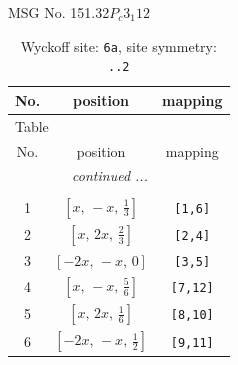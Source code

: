 \documentclass[fleqn,8pt]{jsarticle}
\begin{document}
\setcounter{MaxMatrixCols}{32}

\renewcommand{\tablename}{Table~}
\renewcommand{\figurename}{Figure~}
\begin{center}
\LARGE
MSG No. 151.32\quad$P_{c}3_{1}12$
\end{center}
\renewcommand{\arraystretch}{1.2}
\begin{longtable}{ccc}
\caption{Wyckoff site: {\tt 6a}, site symmetry: {\tt ..2}}
 \\
 \hline \hline
No. & position & mapping \\ \hline \endfirsthead

\multicolumn{2}{l}{\tablename\ \thetable{}} \\
 \hline \hline
No. & position & mapping \\ \hline \endhead

 \hline \hline
\multicolumn{2}{r}{\footnotesize\it continued ...} \\ \endfoot

 \hline \hline
\multicolumn{2}{r}{} \\ \endlastfoot

1 & $\left[ x,\, - x,\, \frac{1}{3} \right]$ & {\tt [1,6]} \\ \hline
2 & $\left[ x,\, 2 x,\, \frac{2}{3} \right]$ & {\tt [2,4]} \\ \hline
3 & $\left[ - 2 x,\, - x,\, 0 \right]$ & {\tt [3,5]} \\ \hline
4 & $\left[ x,\, - x,\, \frac{5}{6} \right]$ & {\tt [7,12]} \\ \hline
5 & $\left[ x,\, 2 x,\, \frac{1}{6} \right]$ & {\tt [8,10]} \\ \hline
6 & $\left[ - 2 x,\, - x,\, \frac{1}{2} \right]$ & {\tt [9,11]} \\
\end{longtable}
\renewcommand{\arraystretch}{1.2}
\end{document}
